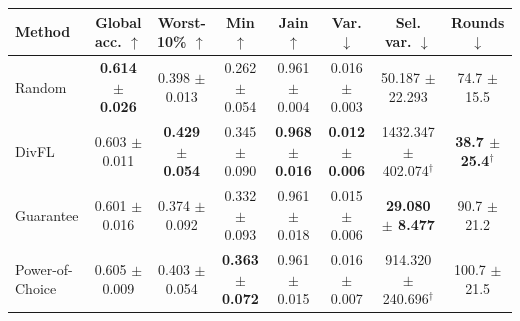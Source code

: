 \begin{tabular}{lccccccc}
\toprule
Method & Global acc. $\uparrow$ & Worst-10\% $\uparrow$ & Min $\uparrow$ & Jain $\uparrow$ & Var. $\downarrow$ & Sel. var. $\downarrow$ & Rounds $\downarrow$ \\
\midrule
Random & \textbf{0.614 $\pm$ 0.026} & 0.398 $\pm$ 0.013 & 0.262 $\pm$ 0.054 & 0.961 $\pm$ 0.004 & 0.016 $\pm$ 0.003 & 50.187 $\pm$ 22.293 & 74.7 $\pm$ 15.5 \\
DivFL & 0.603 $\pm$ 0.011 & \textbf{0.429 $\pm$ 0.054} & 0.345 $\pm$ 0.090 & \textbf{0.968 $\pm$ 0.016} & \textbf{0.012 $\pm$ 0.006} & 1432.347 $\pm$ 402.074$^\dagger$ & \textbf{38.7 $\pm$ 25.4}$^\dagger$ \\
Guarantee & 0.601 $\pm$ 0.016 & 0.374 $\pm$ 0.092 & 0.332 $\pm$ 0.093 & 0.961 $\pm$ 0.018 & 0.015 $\pm$ 0.006 & \textbf{29.080 $\pm$ 8.477} & 90.7 $\pm$ 21.2 \\
Power-of-Choice & 0.605 $\pm$ 0.009 & 0.403 $\pm$ 0.054 & \textbf{0.363 $\pm$ 0.072} & 0.961 $\pm$ 0.015 & 0.016 $\pm$ 0.007 & 914.320 $\pm$ 240.696$^\dagger$ & 100.7 $\pm$ 21.5 \\
\bottomrule
\end{tabular}
